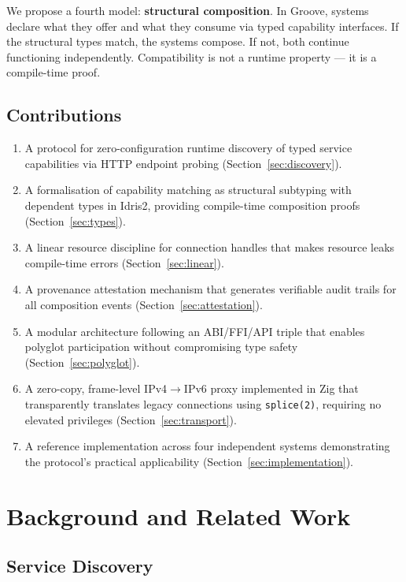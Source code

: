 \documentclass[11pt,a4paper]{article}
\begin{document}
We propose a fourth model: \textbf{structural composition}. In Groove,
systems declare what they offer and what they consume via typed capability
interfaces. If the structural types match, the systems compose. If not,
both continue functioning independently. Compatibility is not a runtime
property --- it is a compile-time proof.

\subsection{Contributions}

\begin{enumerate}
\item A protocol for zero-configuration runtime discovery of typed service
  capabilities via HTTP endpoint probing (Section~\ref{sec:discovery}).
\item A formalisation of capability matching as structural subtyping with
  dependent types in Idris2, providing compile-time composition proofs
  (Section~\ref{sec:types}).
\item A linear resource discipline for connection handles that makes resource
  leaks compile-time errors (Section~\ref{sec:linear}).
\item A provenance attestation mechanism that generates verifiable audit
  trails for all composition events (Section~\ref{sec:attestation}).
\item A modular architecture following an ABI/FFI/API triple that enables
  polyglot participation without compromising type safety
  (Section~\ref{sec:polyglot}).
\item A zero-copy, frame-level IPv4$\rightarrow$IPv6 proxy implemented in Zig
  that transparently translates legacy connections using \texttt{splice(2)},
  requiring no elevated privileges (Section~\ref{sec:transport}).
\item A reference implementation across four independent systems demonstrating
  the protocol's practical applicability (Section~\ref{sec:implementation}).
\end{enumerate}

\section{Background and Related Work}

\subsection{Service Discovery}
\end{document}

